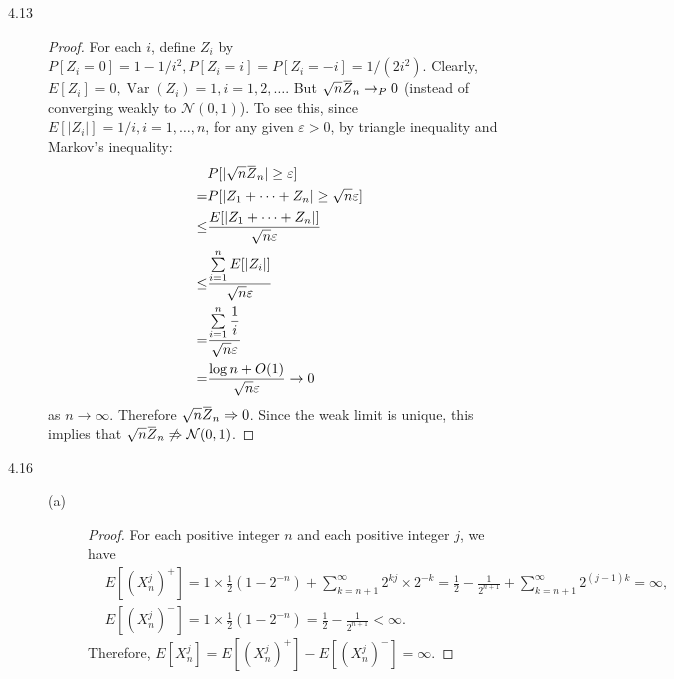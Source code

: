 \documentclass{article}
\newcommand{\eps}{\varepsilon}
\newcommand{\overbar}[1]{\mkern 1.5mu\overline{\mkern-1.5mu#1\mkern-1.5mu}\mkern 1.5mu}
\newcommand{\gaussian}{\mathcal{N}}
\DeclareMathOperator*{\Var}{Var}
\theoremstyle{definition}
\theoremstyle{plain}
\theoremstyle{remark}
\begin{document}
\begin{description}
\item[4.13]
\begin{proof}
For each $i$, define $Z_i$ by $P[Z_i = 0] = 1 - 1/i^2, P[Z_i = i] = P[Z_i = -i] = 1/(2i^2)$. Clearly, $E[Z_i] = 0, \Var(Z_i) = 1, i = 1, 2, \ldots$. But $\sqrt{n}\overbar{Z}_n \to_P 0$ 
(instead of converging weakly to $\gaussian(0, 1)$). To see this, since $E[|Z_i|] = 1/i, i = 1, \ldots, n$, for any given $\eps > 0$, by triangle inequality and Markov's inequality:
\begin{align*}
& P[|\sqrt{n}\overbar{Z}_n| \geq \eps] \\
= & P[|Z_1 + \cdots + Z_n| \geq \sqrt{n}\eps] \\
\leq & \frac{E[|Z_1 + \cdots + Z_n|]}{\sqrt{n}\eps} \\
\leq & \frac{\sum\limits_{i = 1}^n E[|Z_i|]}{\sqrt{n}\eps} \\
= & \frac{\sum\limits_{i = 1}^n \dfrac{1}{i}}{\sqrt{n}\eps} \\
= & \frac{\log n + O(1)}{\sqrt{n} \eps} \to 0 
\end{align*}
as $n \to \infty$. Therefore $\sqrt{n}\overbar{Z}_n \Rightarrow 0$. Since the weak limit is unique, this implies that $\sqrt{n}\overbar{Z}_n \not\Rightarrow \gaussian(0, 1)$.
\end{proof}

\item[4.16]
\begin{description}
\item[(a)]
\begin{proof}
For each positive integer $n$ and each positive integer $j$, we have
\begin{align*}
   & E[(X_n^j)^+] = 1 \times \frac{1}{2}(1 - 2^{-n}) + \sum_{k = n + 1}^\infty 
    2^{kj} \times 2^{-k} = \frac{1}{2} - \frac{1}{2^{n + 1}} + 
    \sum_{k = n + 1}^\infty 2^{(j - 1)k} = \infty, \\
   & E[(X_n^j)^-] = 1 \times \frac{1}{2}(1 - 2^{-n}) = \frac{1}{2} - 
   \frac{1}{2^{n + 1}} < \infty. 
\end{align*}
Therefore, $E[X_n^j] = E[(X_n^j)^+] - E[(X_n^j)^-] = \infty$. 
\end{proof}


\end{description}
\end{description}
\end{document}
